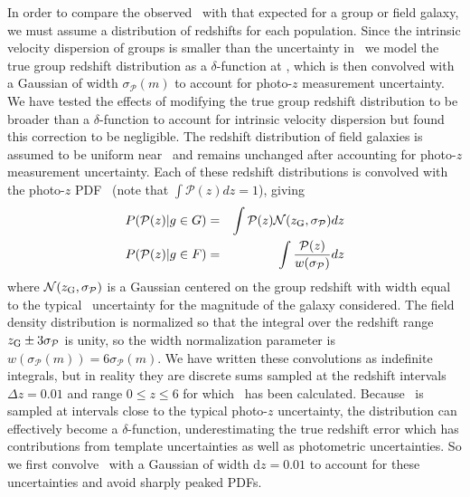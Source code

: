 In order to compare the observed \pz\ with that expected for a group
or field galaxy, we must assume a distribution of redshifts for each
population. Since the intrinsic velocity dispersion of groups is
smaller than the uncertainty in \zp\, we model the true group redshift
distribution as a $\delta$-function at \zG, which is then convolved
with a Gaussian of width $\sigma_{\mathcal{P}}(m)$ to account for
photo-$z$ measurement uncertainty. We have tested the effects of
modifying the true group redshift distribution to be  broader than a
$\delta$-function to account for intrinsic velocity dispersion but
found this correction to be negligible. The redshift distribution
of field galaxies is assumed to be uniform near \zG\ and remains
unchanged after accounting for photo-$z$ measurement uncertainty. Each of
these redshift distributions is convolved with the photo-$z$ PDF \pz\
(note that $\int{\mathcal{P}(z)dz}=1$), giving
\begin{eqnarray}
P(\mbox{$\mathcal{P}(z)$}|g \in G) &=& \int{\mathcal{P}(z) \mathcal{N}(\mbox{$z_{\rm G}$},\sigma_{\mathcal{P}}) dz}  \\
P(\mbox{$\mathcal{P}(z)$}|g \in F) &=& \int{\frac{\mathcal{P}(z)}{w(\sigma_{\mathcal{P}})}dz}
\end{eqnarray}
where $\mathcal{N}(\mbox{$z_{\rm G}$},\sigma_{\mathcal{P}})$ is a Gaussian centered on the
group redshift with width equal to the typical \pz\ uncertainty for the
magnitude of the galaxy considered. The field density distribution is
normalized so that the integral over the redshift range $\mbox{$z_{\rm G}$} \pm
3\sigma_{\mathcal{P}}$ is unity, so the width normalization parameter is
$w(\sigma_{\mathcal{P}}(m))=6\sigma_{\mathcal{P}}(m)$. We have written 
these convolutions as indefinite integrals, but in reality they are
discrete sums sampled at the redshift intervals $\Delta z=0.01$ and range $0
\le z \le 6$ for which \pz\ has been calculated. Because \pz\ is
sampled at intervals close to the typical 
photo-$z$ uncertainty, the distribution can effectively become a
$\delta$-function, underestimating the true redshift error which
has contributions from template uncertainties as well as photometric
uncertainties. So we first convolve \pz\ with a Gaussian of width
d$z=0.01$ to account for these uncertainties and avoid sharply peaked
PDFs.

